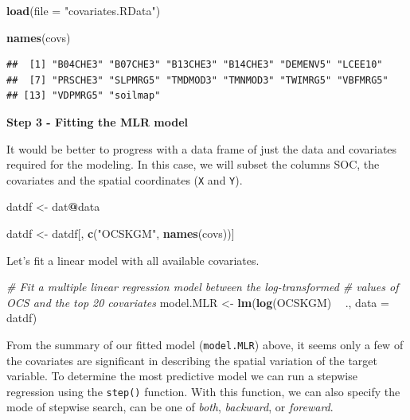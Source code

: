 \documentclass[10pt,b5paper,]{book}
\newenvironment{Shaded}{\begin{snugshade}}{\end{snugshade}}
\newcommand{\CommentTok}[1]{\textcolor[rgb]{0.56,0.35,0.01}{\textit{#1}}}
\newcommand{\DataTypeTok}[1]{\textcolor[rgb]{0.13,0.29,0.53}{#1}}
\newcommand{\KeywordTok}[1]{\textcolor[rgb]{0.13,0.29,0.53}{\textbf{#1}}}
\newcommand{\NormalTok}[1]{#1}
\newcommand{\OperatorTok}[1]{\textcolor[rgb]{0.81,0.36,0.00}{\textbf{#1}}}
\newcommand{\StringTok}[1]{\textcolor[rgb]{0.31,0.60,0.02}{#1}}
\theoremstyle{definition}
\theoremstyle{definition}
\theoremstyle{definition}
\theoremstyle{remark}
\begin{document}
\begin{Shaded}
\begin{Highlighting}[]
\KeywordTok{load}\NormalTok{(}\DataTypeTok{file =} \StringTok{"covariates.RData"}\NormalTok{)}

\KeywordTok{names}\NormalTok{(covs)}
\end{Highlighting}
\end{Shaded}

\begin{verbatim}
##  [1] "B04CHE3" "B07CHE3" "B13CHE3" "B14CHE3" "DEMENV5" "LCEE10" 
##  [7] "PRSCHE3" "SLPMRG5" "TMDMOD3" "TMNMOD3" "TWIMRG5" "VBFMRG5"
## [13] "VDPMRG5" "soilmap"
\end{verbatim}

\textbf{Step 3 - Fitting the MLR model}

It would be better to progress with a data frame of just the data and
covariates required for the modeling. In this case, we will subset the
columns SOC, the covariates and the spatial coordinates (\texttt{X} and
\texttt{Y}).

\begin{Shaded}
\begin{Highlighting}[]
\NormalTok{datdf <-}\StringTok{ }\NormalTok{dat}\OperatorTok{@}\NormalTok{data}

\NormalTok{datdf <-}\StringTok{ }\NormalTok{datdf[, }\KeywordTok{c}\NormalTok{(}\StringTok{"OCSKGM"}\NormalTok{, }\KeywordTok{names}\NormalTok{(covs))]}
\end{Highlighting}
\end{Shaded}

Let's fit a linear model with all available covariates.

\begin{Shaded}
\begin{Highlighting}[]
\CommentTok{# Fit a multiple linear regression model between the log-transformed}
\CommentTok{# values of OCS and the top 20 covariates}
\NormalTok{model.MLR <-}\StringTok{ }\KeywordTok{lm}\NormalTok{(}\KeywordTok{log}\NormalTok{(OCSKGM) }\OperatorTok{~}\StringTok{ }\NormalTok{., }\DataTypeTok{data =}\NormalTok{ datdf)}
\end{Highlighting}
\end{Shaded}

From the summary of our fitted model (\texttt{model.MLR}) above, it
seems only a few of the covariates are significant in describing the
spatial variation of the target variable. To determine the most
predictive model we can run a stepwise regression
 using the \texttt{step()} function.
With this function, we can also specify the mode of stepwise search, can
be one of \emph{both}, \emph{backward}, or \emph{foreward}.
\end{document}

